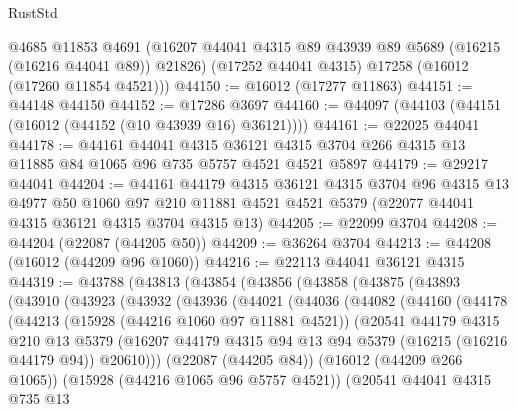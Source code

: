 \begin{lexlean}{RustStd}
\begin{coremodule}
      @4685
      @11853
      @4691
      (@16207 @44041 @4315 @89 @43939 @89 @5689 (@16215 (@16216 @44041 @89)) @21826)
      (@17252 @44041 @4315)
      @17258
      (@16012 (@17260 @11854 @4521)))
@44150 := @16012 (@17277 @11863)
@44151 := @44148 @44150
@44152 := @17286 @3697
@44160 := @44097 (@44103 (@44151 (@16012 (@44152 (@10 @43939 @16) @36121))))
@44161 := @22025 @44041
@44178 := @44161
    @44041
    @4315
    @36121
    @4315
    @3704
    @266
    @4315
    @13
    @11885
    @84
    @1065
    @96
    @735
    @5757
    @4521
    @4521
    @5897
@44179 := @29217 @44041
@44204 := @44161
    @44179
    @4315
    @36121
    @4315
    @3704
    @96
    @4315
    @13
    @4977
    @50
    @1060
    @97
    @210
    @11881
    @4521
    @4521
    @5379
    (@22077 @44041 @4315 @36121 @4315 @3704 @4315 @13)
@44205 := @22099 @3704
@44208 := @44204 (@22087 (@44205 @50))
@44209 := @36264 @3704
@44213 := @44208 (@16012 (@44209 @96 @1060))
@44216 := @22113 @44041 @36121 @4315
@44319 := @43788
    (@43813
      (@43854
        (@43856
          (@43858
            (@43875
              (@43893
                (@43910
                  (@43923
                    (@43932
                      (@43936
                        (@44021
                          (@44036
                            (@44082
                              (@44160
                                (@44178
                                  (@44213
                                    (@15928 (@44216 @1060 @97 @11881 @4521))
                                    (@20541
                                      @44179
                                      @4315
                                      @210
                                      @13
                                      @5379
                                      (@16207
                                        @44179
                                        @4315
                                        @94
                                        @13
                                        @94
                                        @5379
                                        (@16215 (@16216 @44179 @94))
                                        @20610)))
                                  (@22087 (@44205 @84))
                                  (@16012 (@44209 @266 @1065))
                                  (@15928 (@44216 @1065 @96 @5757 @4521))
                                  (@20541
                                    @44041
                                    @4315
                                    @735
                                    @13

\end{coremodule}
\end{lexlean}
